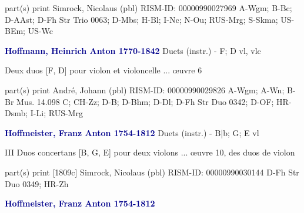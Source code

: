 \documentclass[twocolumn]{book}
\begin{document}
\newline \textcolor{darkblue}{}  part(s)
\newline print
\newline Simrock, Nicolaus  (pbl)
\newline RISM-ID: 00000990027969
\newline A-Wgm; B-Bc; D-AAst; D-Fh  Str Trio 0063; D-Mbs; H-Bl; I-Nc; N-Ou; RUS-Mrg; S-Skma; US-BEm; US-Wc
\newline \par \vspace{7pt} \textcolor{darkblue}{\textbf{Hoffmann, Heinrich Anton  1770-1842}}
\newline Duets (instr.) - F; D
\newline vl, vlc
\newline \begin{itshape}Deux duos [F, D] pour violon et violoncelle ... œuvre 6\end{itshape} 
\newline \textcolor{darkblue}{}  part(s)
\newline print
\newline André, Johann  (pbl)
\newline RISM-ID: 00000990029826
\newline A-Wgm; A-Wn; B-Br  Mus. 14.098 C; CH-Zz; D-B; D-Bhm; D-Dl; D-Fh  Str Duo 0342; D-OF; HR-Dsmb; I-Li; RUS-Mrg
\newline \par \vspace{7pt} \textcolor{darkblue}{\textbf{Hoffmeister, Franz Anton  1754-1812}}
\newline Duets (instr.) - B|b; G; E
 vl
\newline \begin{itshape}III Duos concertans [B, G, E] pour deux violons ... œuvre 10, des duos de violon\end{itshape} 
\newline \textcolor{darkblue}{}  part(s)
\newline print  [1809c]
\newline Simrock, Nicolaus  (pbl)
\newline RISM-ID: 00000990030144
\newline D-Fh  Str Duo 0349; HR-Zh
\newline \par \vspace{7pt} \textcolor{darkblue}{\textbf{Hoffmeister, Franz Anton  1754-1812}}
\end{document}
